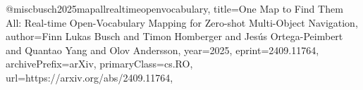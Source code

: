 \clearpage
\printbib
\clearpage

\listoffigures
\clearpage

\listoftables
\clearpage

\listoflistings
\clearpage

% 

@misc{busch2025mapallrealtimeopenvocabulary,
      title={One Map to Find Them All: Real-time Open-Vocabulary Mapping for Zero-shot Multi-Object Navigation}, 
      author={Finn Lukas Busch and Timon Homberger and Jesús Ortega-Peimbert and Quantao Yang and Olov Andersson},
      year={2025},
      eprint={2409.11764},
      archivePrefix={arXiv},
      primaryClass={cs.RO},
      url={https://arxiv.org/abs/2409.11764}, 
}